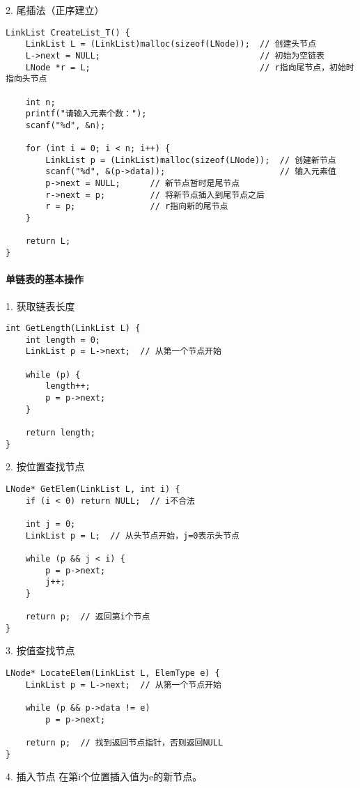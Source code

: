 \documentclass{../../note}
\begin{document}
2. 尾插法（正序建立）
\begin{verbatim}
LinkList CreateList_T() {
    LinkList L = (LinkList)malloc(sizeof(LNode));  // 创建头节点
    L->next = NULL;                                // 初始为空链表
    LNode *r = L;                                  // r指向尾节点，初始时指向头节点

    int n;
    printf("请输入元素个数：");
    scanf("%d", &n);

    for (int i = 0; i < n; i++) {
        LinkList p = (LinkList)malloc(sizeof(LNode));  // 创建新节点
        scanf("%d", &(p->data));                       // 输入元素值
        p->next = NULL;      // 新节点暂时是尾节点
        r->next = p;         // 将新节点插入到尾节点之后
        r = p;               // r指向新的尾节点
    }

    return L;
}
\end{verbatim}

\paragraph{单链表的基本操作}

1. 获取链表长度
\begin{verbatim}
int GetLength(LinkList L) {
    int length = 0;
    LinkList p = L->next;  // 从第一个节点开始

    while (p) {
        length++;
        p = p->next;
    }

    return length;
}
\end{verbatim}

2. 按位置查找节点
\begin{verbatim}
LNode* GetElem(LinkList L, int i) {
    if (i < 0) return NULL;  // i不合法

    int j = 0;
    LinkList p = L;  // 从头节点开始，j=0表示头节点

    while (p && j < i) {
        p = p->next;
        j++;
    }

    return p;  // 返回第i个节点
}
\end{verbatim}

3. 按值查找节点
\begin{verbatim}
LNode* LocateElem(LinkList L, ElemType e) {
    LinkList p = L->next;  // 从第一个节点开始

    while (p && p->data != e)
        p = p->next;

    return p;  // 找到返回节点指针，否则返回NULL
}
\end{verbatim}

4. 插入节点
在第i个位置插入值为e的新节点。
\end{document}
